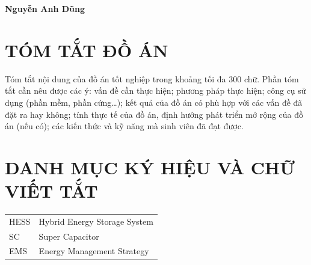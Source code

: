 \documentclass{thesis}
\begin{document}
\vspace{2cm}
    \hspace{8.8cm}\textbf{Nguyễn Anh Dũng} %

\newpage %

\section*{TÓM TẮT ĐỒ ÁN}
    \thispagestyle{empty}
Tóm tắt nội dung của đồ án tốt nghiệp trong khoảng tối đa 300 chữ. Phần tóm tắt cần nêu được các ý: vấn đề cần thực hiện; phương pháp thực hiện; công cụ sử dụng (phần mềm, phần cứng…); kết quả của đồ án có phù hợp với các vấn đề đã đặt ra hay không; tính thực tế của đồ án, định hướng phát triển mở rộng của đồ án (nếu có); các kiến thức và kỹ năng mà sinh viên đã đạt được.


\thispagestyle{empty}
    \cleardoublepage

\tableofcontents 
    \thispagestyle{empty}
        \newpage

\section*{DANH MỤC KÝ HIỆU VÀ CHỮ VIẾT TẮT}
     {}

\begin{tabular}{ l l }
    \hspace{1cm} HESS & \hspace{4cm} Hybrid Energy Storage System \\  
    \hspace{1cm} SC & \hspace{4cm} Super Capacitor    \\
    \hspace{1cm} EMS  & \hspace{4cm} Energy Management Strategy 
\end{tabular}  
    \newpage

{\let\oldnumberline\numberline
    \renewcommand{\numberline}{Hình~\oldnumberline}
        \listoffigures}
\newpage
\end{document}
